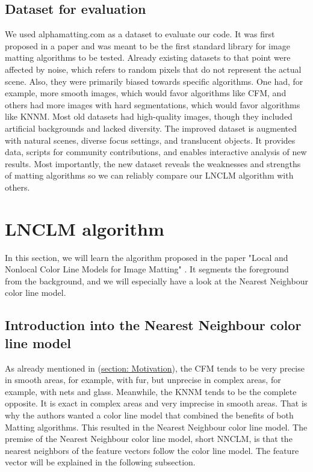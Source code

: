 \subsection{Dataset for evaluation}
We used alphamatting.com as a dataset to evaluate our code. It was first proposed in a paper \cite{benchmark} and was meant to be the first standard library for image matting algorithms to be tested. Already existing datasets to that point were affected by noise, which refers to random pixels that do not represent the actual scene. Also, they were primarily biased towards specific algorithms. One had, for example, more smooth images, which would favor algorithms like CFM, and others had more images with hard segmentations, which would favor algorithms like KNNM. Most old datasets had high-quality images, though they included artificial backgrounds and lacked diversity.
The improved dataset \cite{benchmark} is augmented with natural scenes, diverse focus settings, and translucent objects. It provides data, scripts for community contributions, and enables interactive analysis of new results. Most importantly, the new dataset reveals the weaknesses and strengths of matting algorithms so we can reliably compare our LNCLM algorithm with others.



\section{LNCLM algorithm}
\label{sec:algorithm}
In this section, we will learn the algorithm proposed in the paper "Local and Nonlocal Color Line Models for Image Matting" \cite{lnclm}. It segments the foreground from the background, and we will especially have a look at the Nearest Neighbour color line model. 

\subsection{Introduction into the Nearest Neighbour color line model}
As already mentioned in (\hyperref[sec:motivation]{section: Motivation}), the CFM tends to be very precise in smooth areas, for example, with fur, but unprecise in complex areas, for example, with nets and glass. Meanwhile, the KNNM tends to be the complete opposite. It is exact in complex areas and very imprecise in smooth areas.
That is why the authors wanted a color line model that combined the benefits of both Matting algorithms. This resulted in the Nearest Neighbour color line model.
The premise of the Nearest Neighbour color line model, short NNCLM, is that the nearest neighbors of the feature vectors follow the color line model. The feature vector will be explained in the following subsection.

